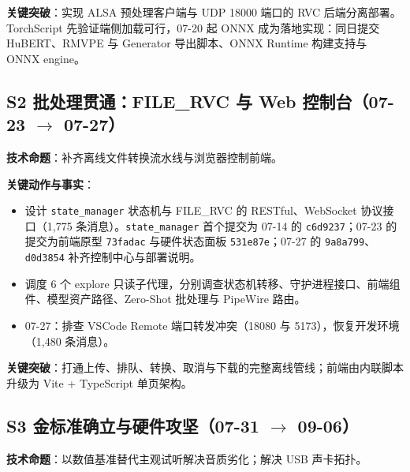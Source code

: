 \documentclass[11pt,a4paper]{ctexart}
\newcommand{\code}[1]{\texttt{#1}}
\begin{document}
\textbf{关键突破}：实现 ALSA 预处理客户端与 UDP 18000 端口的 RVC 后端分离部署。
TorchScript 先验证端侧加载可行，07-20 起 ONNX 成为落地实现：同日提交 HuBERT、RMVPE 与 Generator 导出脚本、ONNX Runtime 构建支持与 ONNX engine。

\subsection{S2 批处理贯通：FILE\_RVC 与 Web 控制台（07-23 $\rightarrow$ 07-27）}

\textbf{技术命题}：补齐离线文件转换流水线与浏览器控制前端。

\textbf{关键动作与事实}：
\begin{itemize}[leftmargin=1.6em,itemsep=0.2em]
  \item 设计 \code{state\_manager} 状态机与 FILE\_RVC 的 RESTful、WebSocket 协议接口（1,775 条消息）。\code{state\_manager} 首个提交为 07-14 的 \code{c6d9237}；07-23 的提交为前端原型 \code{73fadac} 与硬件状态面板 \code{531e87e}；07-27 的 \code{9a8a799}、\code{d0d3854} 补齐控制中心与部署说明。
  \item 调度 6 个 explore 只读子代理，分别调查状态机转移、守护进程接口、前端组件、模型资产路径、Zero-Shot 批处理与 PipeWire 路由。
  \item 07-27：排查 VSCode Remote 端口转发冲突（18080 与 5173），恢复开发环境（1,480 条消息）。
\end{itemize}

\textbf{关键突破}：打通上传、排队、转换、取消与下载的完整离线管线；前端由内联脚本升级为 Vite + TypeScript 单页架构。

\subsection{S3 金标准确立与硬件攻坚（07-31 $\rightarrow$ 09-06）}

\textbf{技术命题}：以数值基准替代主观试听解决音质劣化；解决 USB 声卡拓扑。
\end{document}
